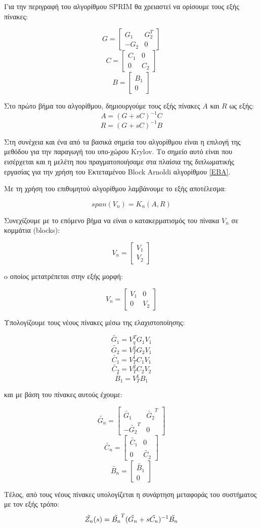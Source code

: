 Για την περιγραφή του αλγορίθμου \textlatin{SPRIM} θα χρειαστεί να ορίσουμε τους εξής πίνακες:

\[
   G = 
    \begin{bmatrix}
    G_1  & G^T_2\\
    -G_2 & 0
    \end{bmatrix}
\]
\[
    C = 
    \begin{bmatrix}
    C_1  & 0\\
    0 & C_2
    \end{bmatrix}
\]
\[
    B = 
    \begin{bmatrix}
    B_1\\
    0
    \end{bmatrix}
\]

Στο πρώτο βήμα του αλγορίθμου, δημιουργούμε τους εξής πίνακες $A$ και $R$ ως εξής:
\[
    A = (G + sC)^{-1}C
\]
\[
    R = (G + sC)^{-1}B
\]

Στη συνέχεια και ένα από τα βασικά σημεία του αλγορίθμου είναι η επιλογή της μεθόδου για την παραγωγή του υπο-χώρου \textlatin{Krylov}. Το σημείο αυτό είναι που εισέρχεται και η μελέτη που πραγματοποιήσαμε στα πλαίσια της διπλωματικής εργασίας για την χρήση του Εκτεταμένου \textlatin{Block Arnoldi} αλγορίθμου \ref{EBA}.

Με τη χρήση του επιθυμητού αλγορίθμου λαμβάνουμε το εξής αποτέλεσμα:

\[
    span(V_n) = K_n(A, R)
\]

Συνεχίζουμε με το επόμενο βήμα να είναι ο κατακερματισμός του πίνακα $V_n$ σε κομμάτια (\textlatin{blocks}):

\[
V_n = \begin{bmatrix}
V_1 \\
V_2
\end{bmatrix}
\]

o οποίος μετατρέπεται στην εξής μορφή:

\[
V_n = \begin{bmatrix}
V_1 & 0 \\
0 & V_2
\end{bmatrix}
\]

Υπολογίζουμε τους νέους πίνακες μέσω της ελαχιστοποίησης:

\[
    \widetilde{G_1} = V_q^{T}G_1V_1
\]
\[
    \widetilde{G_2} = V^2_TG_2V_1
\]
\[
    \widetilde{C_1} = V^1_TC_1V_1
\]
\[
    \widetilde{C_2} = V^2_TC_2V_2
\]
\[
    \widetilde{B_1} = V^1_TB_1
\]

και με βάση του πίνακες αυτούς έχουμε:


\[
\widetilde{G_n} = \begin{bmatrix}
\widetilde{G_1} & \widetilde{G_2}^T \\
-\widetilde{G_2}^T & 0
\end{bmatrix}
\]
\[
\widetilde{C_n} = \begin{bmatrix}
\widetilde{C_1} & 0 \\
0 & \widetilde{C_2}
\end{bmatrix}
\]
\[
\widetilde{B_n} = \begin{bmatrix}
\widetilde{B_1} \\
0
\end{bmatrix}
\]

Τέλος, από τους νέους πίνακες υπολογίζεται η συνάρτηση μεταφοράς του συστήματος με
τον εξής τρόπο:
\begin{equation}
    \Tilde{Z_n}(s) = \Tilde{B_n}^T(\Tilde{G_n} + s\Tilde{C_n})^{-1}\Tilde{B_n}
\end{equation}
